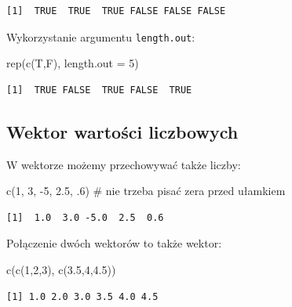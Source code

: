 \documentclass[
  letterpaper,
  DIV=11,
  numbers=noendperiod]{scrreprt}
\newenvironment{Shaded}{\begin{snugshade}}{\end{snugshade}}
\newcommand{\AttributeTok}[1]{\textcolor[rgb]{0.40,0.45,0.13}{#1}}
\newcommand{\CommentTok}[1]{\textcolor[rgb]{0.37,0.37,0.37}{#1}}
\newcommand{\DecValTok}[1]{\textcolor[rgb]{0.68,0.00,0.00}{#1}}
\newcommand{\FloatTok}[1]{\textcolor[rgb]{0.68,0.00,0.00}{#1}}
\newcommand{\FunctionTok}[1]{\textcolor[rgb]{0.28,0.35,0.67}{#1}}
\newcommand{\NormalTok}[1]{\textcolor[rgb]{0.00,0.23,0.31}{#1}}
\newcommand{\SpecialCharTok}[1]{\textcolor[rgb]{0.37,0.37,0.37}{#1}}
\begin{document}
\begin{verbatim}
[1]  TRUE  TRUE  TRUE FALSE FALSE FALSE
\end{verbatim}

Wykorzystanie argumentu \texttt{length.out}:

\begin{Shaded}
\begin{Highlighting}[]
\FunctionTok{rep}\NormalTok{(}\FunctionTok{c}\NormalTok{(T,F), }\AttributeTok{length.out =} \DecValTok{5}\NormalTok{)}
\end{Highlighting}
\end{Shaded}

\begin{verbatim}
[1]  TRUE FALSE  TRUE FALSE  TRUE
\end{verbatim}

\hypertarget{wektor-wartoux15bci-liczbowych}{%
\subsection{Wektor wartości
liczbowych}\label{wektor-wartoux15bci-liczbowych}}

W wektorze możemy przechowywać także liczby:

\begin{Shaded}
\begin{Highlighting}[]
\FunctionTok{c}\NormalTok{(}\DecValTok{1}\NormalTok{, }\DecValTok{3}\NormalTok{, }\SpecialCharTok{{-}}\DecValTok{5}\NormalTok{, }\FloatTok{2.5}\NormalTok{, .}\DecValTok{6}\NormalTok{) }\CommentTok{\# nie trzeba pisać zera przed ułamkiem}
\end{Highlighting}
\end{Shaded}

\begin{verbatim}
[1]  1.0  3.0 -5.0  2.5  0.6
\end{verbatim}

Połączenie dwóch wektorów to także wektor:

\begin{Shaded}
\begin{Highlighting}[]
\FunctionTok{c}\NormalTok{(}\FunctionTok{c}\NormalTok{(}\DecValTok{1}\NormalTok{,}\DecValTok{2}\NormalTok{,}\DecValTok{3}\NormalTok{), }\FunctionTok{c}\NormalTok{(}\FloatTok{3.5}\NormalTok{,}\DecValTok{4}\NormalTok{,}\FloatTok{4.5}\NormalTok{))}
\end{Highlighting}
\end{Shaded}

\begin{verbatim}
[1] 1.0 2.0 3.0 3.5 4.0 4.5
\end{verbatim}
\end{document}
